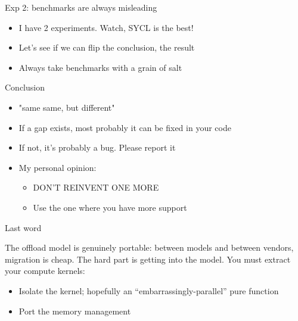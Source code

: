 \begin{frame}{Exp 2: benchmarks are always misleading}

\begin{itemize}
    \item I have 2 experiments. Watch, SYCL is the best!
    \item Let's see if we can flip the conclusion, the result
    \item Always take benchmarks with a grain of salt
\end{itemize}

\end{frame}


\begin{frame}{Conclusion}
    \begin{itemize}
        \item "same same, but different"
        \item If a gap exists, most probably it can be fixed in your code
        \item If not, it's probably a bug. Please report it
        \item My personal opinion:
            \begin{itemize}
                \item DON'T REINVENT ONE MORE
                \item Use the one where you have more support
            \end{itemize}
    \end{itemize}
\end{frame}

\begin{frame}{Last word}

The offload model is genuinely portable: between models and between vendors,
migration is cheap. The hard part is getting into the model. You must extract your compute kernels:
\begin{itemize}
    \item Isolate the kernel; hopefully an ``embarrassingly-parallel'' pure function
    \item Port the memory management

\end{itemize}
    
\end{frame}
